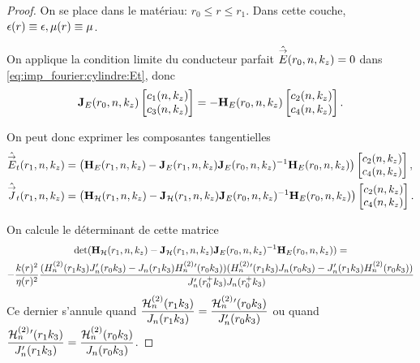     \begin{proof}
      On se place dans le matériau: \(r_0 \le r \le r_ 1 \). Dans cette couche, \(\epsilon(r)\equiv \epsilon, \mu(r)\equiv \mu\).

      On applique la condition limite du conducteur parfait \(\hat {{\overset{\rightarrow}{E}}}(r_0,n,k_z) = 0\) dans \eqref{eq:imp_fourier:cylindre:Et}, donc
      \begin{equation*}
        \mathbf{J}_{E}(r_0,n,k_z)
        \begin{bmatrix}
          c_1(n,k_z) \\
          c_3(n,k_z)
        \end{bmatrix}
        =-\mathbf{H}_{E}(r_0,n,k_z)
        \begin{bmatrix}
          c_2(n,k_z) \\
          c_4(n,k_z)
        \end{bmatrix}.
      \end{equation*}

      On peut donc exprimer les composantes tangentielles%
      \begin{align*}
        \hat {{\overset{\rightarrow}{E}}}_t(r_1,n,k_z) &=
        \left(\mathbf{H}_{E}(r_1,n,k_z) - \mathbf{J}_{E}(r_1,n,k_z)\mathbf{J}_{E}(r_0,n,k_z)^{-1}\mathbf{H}_{E}(r_0,n,k_z)\right)
        \begin{bmatrix}
          c_2(n,k_z) \\
          c_4(n,k_z)
        \end{bmatrix},
        \\
        \hat {{\overset{\rightarrow}{J}}}_t(r_1,n,k_z) &=
        \left(\mathbf{H}_{\mathcal{H}}(r_1,n,k_z) - \mathbf{J}_{\mathcal{H}}(r_1,n,k_z)\mathbf{J}_{E}(r_0,n,k_z)^{-1}\mathbf{H}_{E}(r_0,n,k_z) \right)
        \begin{bmatrix}
          c_2(n,k_z) \\
          c_4(n,k_z)
        \end{bmatrix}.
      \end{align*}

      On calcule le déterminant de cette matrice 
      \begin{multline*}
        \det(\mathbf{H}_{\mathcal{H}}(r_1,n,k_z) - \mathbf{J}_{\mathcal{H}}(r_1,n,k_z)\mathbf{J}_{E}(r_0,n,k_z)^{-1}\mathbf{H}_{E}(r_0,n,k_z)) = \\
        -\dfrac{k(r)^2}{\eta(r)^2}\dfrac{(H_n^{(2)}(r_1k_3)J_n'(r_0k_3)-J_n(r_1k_3)H_n^{(2)}{}'(r_0k_3))(H_n^{(2)}{}'(r_1k_3)J_n(r_0k_3)-J_n'(r_1k_3)H_n^{(2)}(r_0k_3))}{J_n'(r_0^+k_3)J_n(r_0^+k_3)}
      \end{multline*}
      Ce dernier s'annule quand \(\dfrac{\mathcal{H}_n^{(2)}(r_1k_3)}{J_n(r_1k_3)} = \dfrac{\mathcal{H}_n^{(2)}{}'(r_0k_3)}{J_n'(r_0k_3)}\) ou quand \(\dfrac{\mathcal{H}_n^{(2)}{}'(r_1k_3)}{J_n'(r_1k_3)} = \dfrac{\mathcal{H}_n^{(2)}(r_0k_3)}{J_n(r_0k_3)}\).


\end{proof}
